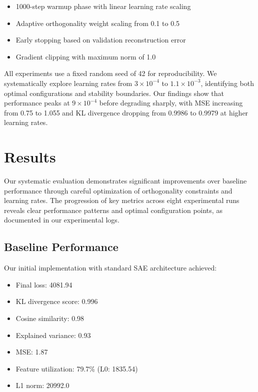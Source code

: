 \documentclass{article} %
\begin{document}
\begin{itemize}
    \item 1000-step warmup phase with linear learning rate scaling
    \item Adaptive orthogonality weight scaling from 0.1 to 0.5
    \item Early stopping based on validation reconstruction error
    \item Gradient clipping with maximum norm of 1.0
\end{itemize}

All experiments use a fixed random seed of 42 for reproducibility. We systematically explore learning rates from $3 \times 10^{-4}$ to $1.1 \times 10^{-3}$, identifying both optimal configurations and stability boundaries. Our findings show that performance peaks at $9 \times 10^{-4}$ before degrading sharply, with MSE increasing from 0.75 to 1.055 and KL divergence dropping from 0.9986 to 0.9979 at higher learning rates.

\section{Results}
\label{sec:results}

Our systematic evaluation demonstrates significant improvements over baseline performance through careful optimization of orthogonality constraints and learning rates. The progression of key metrics across eight experimental runs reveals clear performance patterns and optimal configuration points, as documented in our experimental logs.

\subsection{Baseline Performance}
Our initial implementation with standard SAE architecture achieved:
\begin{itemize}
    \item Final loss: 4081.94
    \item KL divergence score: 0.996
    \item Cosine similarity: 0.98
    \item Explained variance: 0.93
    \item MSE: 1.87
    \item Feature utilization: 79.7\% (L0: 1835.54)
    \item L1 norm: 20992.0
\end{itemize}
\end{document}
